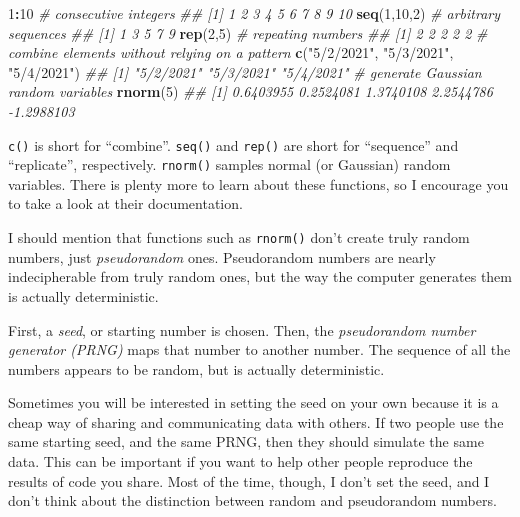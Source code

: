 \documentclass[12pt,krantz2]{krantz}
\makeatletter
\newenvironment{Shaded}{\begin{snugshade}}{\end{snugshade}}
\newcommand{\CommentTok}[1]{\textcolor[rgb]{0.37,0.37,0.37}{\textit{#1}}}
\newcommand{\DecValTok}[1]{\textcolor[rgb]{0.06,0.06,0.06}{#1}}
\newcommand{\KeywordTok}[1]{\textcolor[rgb]{0.27,0.27,0.27}{\textbf{#1}}}
\newcommand{\NormalTok}[1]{#1}
\newcommand{\OperatorTok}[1]{\textcolor[rgb]{0.43,0.43,0.43}{\textbf{#1}}}
\newcommand{\StringTok}[1]{\textcolor[rgb]{0.5,0.5,0.5}{#1}}
\newenvironment{kframe}{%
\medskip{}
\setlength{\fboxsep}{.8em}
 \def\at@end@of@kframe{}%
 \ifinner\ifhmode%
  \def\at@end@of@kframe{\end{minipage}}%
  \begin{minipage}{\columnwidth}%
 \fi\fi%
 \def\FrameCommand##1{\hskip\@totalleftmargin \hskip-\fboxsep
 \colorbox{shadecolor}{##1}\hskip-\fboxsep
     \hskip-\linewidth \hskip-\@totalleftmargin \hskip\columnwidth}%
 \MakeFramed {\advance\hsize-\width
   \@totalleftmargin\z@ \linewidth\hsize
   \@setminipage}}%
 {\par\unskip\endMakeFramed%
 \at@end@of@kframe}
\renewenvironment{Shaded}{\begin{kframe}}{\end{kframe}}
\makeatother
\begin{document}
\begin{Shaded}
\begin{Highlighting}[]
\DecValTok{1}\OperatorTok{:}\DecValTok{10}         \CommentTok{# consecutive integers}
\CommentTok{##  [1]  1  2  3  4  5  6  7  8  9 10}
\KeywordTok{seq}\NormalTok{(}\DecValTok{1}\NormalTok{,}\DecValTok{10}\NormalTok{,}\DecValTok{2}\NormalTok{)  }\CommentTok{# arbitrary sequences}
\CommentTok{## [1] 1 3 5 7 9}
\KeywordTok{rep}\NormalTok{(}\DecValTok{2}\NormalTok{,}\DecValTok{5}\NormalTok{)     }\CommentTok{# repeating numbers}
\CommentTok{## [1] 2 2 2 2 2}
\CommentTok{# combine elements without relying on a pattern}
\KeywordTok{c}\NormalTok{(}\StringTok{"5/2/2021"}\NormalTok{, }\StringTok{"5/3/2021"}\NormalTok{, }\StringTok{"5/4/2021"}\NormalTok{) }
\CommentTok{## [1] "5/2/2021" "5/3/2021" "5/4/2021"}
\CommentTok{# generate Gaussian random variables}
\KeywordTok{rnorm}\NormalTok{(}\DecValTok{5}\NormalTok{)                             }
\CommentTok{## [1]  0.6403955  0.2524081  1.3740108  2.2544786 -1.2988103}
\end{Highlighting}
\end{Shaded}

\texttt{c()} is short for ``combine''. \texttt{seq()} and \texttt{rep()} are short for ``sequence'' and ``replicate'', respectively. \texttt{rnorm()} samples normal (or Gaussian) random variables. There is plenty more to learn about these functions, so I encourage you to take a look at their documentation.

\begin{rmd-details}
I should mention that functions such as \texttt{rnorm()} don't create truly random numbers, just \emph{pseudorandom} ones. Pseudorandom numbers are nearly indecipherable from truly random ones, but the way the computer generates them is actually deterministic.

First, a \emph{seed}, or starting number is chosen. Then, the \emph{pseudorandom number generator (PRNG)} maps that number to another number. The sequence of all the numbers appears to be random, but is actually deterministic.

Sometimes you will be interested in setting the seed on your own because it is a cheap way of sharing and communicating data with others. If two people use the same starting seed, and the same PRNG, then they should simulate the same data. This can be important if you want to help other people reproduce the results of code you share. Most of the time, though, I don't set the seed, and I don't think about the distinction between random and pseudorandom numbers.

\end{rmd-details}
\end{document}
